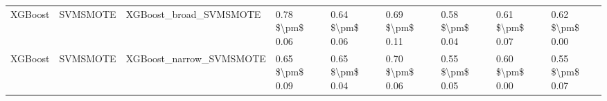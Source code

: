 \begin{tabular}{lllllllll}
                        XGBoost &                      SVMSMOTE &                       XGBoost\_broad\_SVMSMOTE & 0.78 \$\textbackslash pm\$ 0.06 &           0.64 \$\textbackslash pm\$ 0.06 &       0.69 \$\textbackslash pm\$ 0.11 &        0.58 \$\textbackslash pm\$ 0.04 &                         0.61 \$\textbackslash pm\$ 0.07 & 0.62 \$\textbackslash pm\$ 0.00 \\
                        XGBoost &                      SVMSMOTE &                      XGBoost\_narrow\_SVMSMOTE & 0.65 \$\textbackslash pm\$ 0.09 &           0.65 \$\textbackslash pm\$ 0.04 &       0.70 \$\textbackslash pm\$ 0.06 &        0.55 \$\textbackslash pm\$ 0.05 &                         0.60 \$\textbackslash pm\$ 0.00 & 0.55 \$\textbackslash pm\$ 0.07 \\
\bottomrule
\end{tabular}
